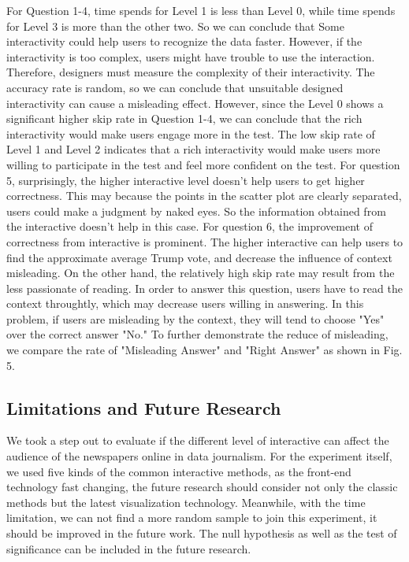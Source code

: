 \documentclass[9pt,journal,compsoc]{IEEEtran}
\begin{document}
For Question 1-4, time spends for Level 1 is less than Level 0, while time spends for Level 3 is more than the other two. So we can conclude that Some interactivity could help users to recognize the data faster. However, if the interactivity is too complex, users might have trouble to use the interaction. Therefore, designers must measure the complexity of their interactivity. The accuracy rate is random, so we can conclude that unsuitable designed interactivity can cause a misleading effect. However, since the Level 0 shows a significant higher skip rate in Question 1-4, we can conclude that the rich interactivity would make users engage more in the test. The low skip rate of Level 1 and Level 2 indicates that a rich interactivity would make users more willing to participate in the test and feel more confident on the test.
For question 5, surprisingly, the higher interactive level doesn't help users to get higher correctness. This may because the points in the scatter plot are clearly separated,  users could make a judgment by naked eyes. So the information obtained from the interactive doesn't help in this case. For question 6, the improvement of correctness from interactive is prominent. The higher interactive can help users to find the approximate average Trump vote, and decrease the influence of context misleading. On the other hand, the relatively high skip rate may result from the less passionate of reading. In order to answer this question, users have to read the context throughtly, which may decrease users willing in answering. In this problem, if users are misleading by the context, they will tend to choose "Yes" over the correct answer "No." To further demonstrate the reduce of misleading, we compare the rate of "Misleading Answer" and "Right Answer" as shown in Fig. 5.

\subsection{Limitations and Future Research}

We took a step out to evaluate if the different level of interactive can affect the audience of the newspapers online in data journalism. For the experiment itself, we used five kinds of the common interactive methods, as the front-end technology fast changing, the future research should consider not only the classic methods but the latest visualization technology. Meanwhile, with the time limitation, we can not find a more random sample to join this experiment, it should be improved in the future work. The null hypothesis as well as the test of significance can be included in the future research.
\end{document}
